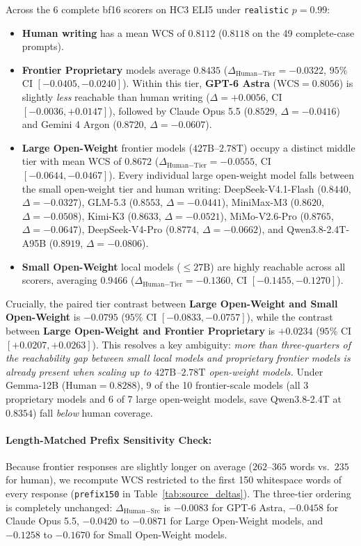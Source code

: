 \documentclass[11pt,a4paper,twocolumn]{article}
\begin{document}
Across the 6 complete bf16 scorers on HC3 ELI5 under \texttt{realistic} $p=0.99$:
\begin{itemize}
    \item \textbf{Human writing} has a mean WCS of \textbf{$0.8112$} ($0.8118$ on the 49 complete-case prompts).
    \item \textbf{Frontier Proprietary} models average \textbf{$0.8435$} ($\Delta_{\text{Human}-\text{Tier}} = -0.0322$, $95\%$ CI $[-0.0405, -0.0240]$). Within this tier, \textbf{GPT-6 Astra} ($\text{WCS}=0.8056$) is slightly \emph{less} reachable than human writing ($\Delta = +0.0056$, CI $[-0.0036, +0.0147]$), followed by Claude Opus 5.5 ($0.8529$, $\Delta = -0.0416$) and Gemini 4 Argon ($0.8720$, $\Delta = -0.0607$).
    \item \textbf{Large Open-Weight} frontier models ($427\text{B}$--$2.78\text{T}$) occupy a distinct middle tier with mean WCS of \textbf{$0.8672$} ($\Delta_{\text{Human}-\text{Tier}} = -0.0555$, CI $[-0.0644, -0.0467]$). Every individual large open-weight model falls between the small open-weight tier and human writing: DeepSeek-V4.1-Flash ($0.8440$, $\Delta = -0.0327$), GLM-5.3 ($0.8553$, $\Delta = -0.0441$), MiniMax-M3 ($0.8620$, $\Delta = -0.0508$), Kimi-K3 ($0.8633$, $\Delta = -0.0521$), MiMo-V2.6-Pro ($0.8765$, $\Delta = -0.0647$), DeepSeek-V4-Pro ($0.8774$, $\Delta = -0.0662$), and Qwen3.8-2.4T-A95B ($0.8919$, $\Delta = -0.0806$).
    \item \textbf{Small Open-Weight} local models ($\le 27\text{B}$) are highly reachable across all scorers, averaging \textbf{$0.9466$} ($\Delta_{\text{Human}-\text{Tier}} = -0.1360$, CI $[-0.1455, -0.1270]$).
\end{itemize}

Crucially, the paired tier contrast between \textbf{Large Open-Weight and Small Open-Weight} is \textbf{$-0.0795$} ($95\%$ CI $[-0.0833, -0.0757]$), while the contrast between \textbf{Large Open-Weight and Frontier Proprietary} is \textbf{$+0.0234$} ($95\%$ CI $[+0.0207, +0.0263]$). This resolves a key ambiguity: \emph{more than three-quarters of the reachability gap between small local models and proprietary frontier models is already present when scaling up to $427\text{B}$--$2.78\text{T}$ open-weight models.} Under Gemma-12B ($\text{Human}=0.8288$), 9 of the 10 frontier-scale models (all 3 proprietary models and 6 of 7 large open-weight models, save Qwen3.8-2.4T at $0.8354$) fall \emph{below} human coverage.

\paragraph{Length-Matched Prefix Sensitivity Check:}
Because frontier responses are slightly longer on average ($262$--$365$ words vs.\ $235$ for human), we recompute WCS restricted to the first 150 whitespace words of every response (\texttt{prefix150} in Table~\ref{tab:source_deltas}). The three-tier ordering is completely unchanged: $\Delta_{\text{Human}-\text{Src}}$ is $-0.0083$ for GPT-6 Astra, $-0.0458$ for Claude Opus 5.5, $-0.0420$ to $-0.0871$ for Large Open-Weight models, and $-0.1258$ to $-0.1670$ for Small Open-Weight models.
\end{document}
